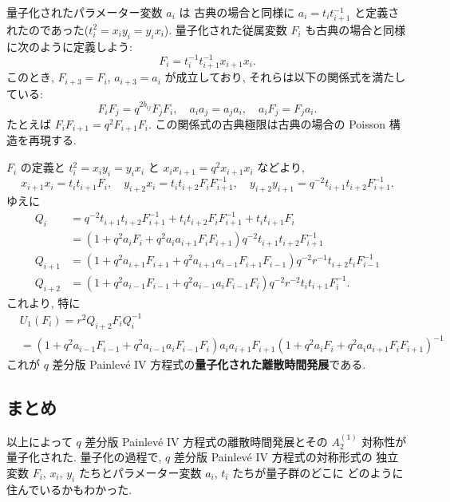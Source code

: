 \documentclass[12pt,twoside,dvipdfm]{msjproc}
\theoremstyle{definition} %
\theoremstyle{definition} %
\theoremstyle{definition} %
\numberwithin{theorem}{section}
\numberwithin{equation}{section}
\numberwithin{figure}{section}
\numberwithin{table}{section}
\begin{document}
量子化されたパラメーター変数 $a_i$ は
古典の場合と同様に $a_i=t_i t_{i+1}^{-1}$ と定義されたのであった($t_i^2=x_i y_i=y_i x_i$).
量子化された従属変数 $F_i$ も古典の場合と同様に次のように定義しよう:
\begin{equation*}
  F_i = t_i^{-1} t_{i+1}^{-1} x_{i+1} x_i.
\end{equation*}
このとき, $F_{i+3}=F_i$, $a_{i+3}=a_i$ が成立しており, 
それらは以下の関係式を満たしている:
\begin{equation*}
  F_i F_j = q^{2 b_{ij}} F_j F_i,  \quad
 a_i a_j = a_j a_i, \quad 
 a_i F_j = F_j a_i.
\end{equation*}
たとえば $F_i F_{i+1}=q^2 F_{i+1} F_i$.
この関係式の古典極限は古典の場合の Poisson 構造を再現する.


$F_i$ の定義と $t_i^2= x_i y_i = y_i x_i$ と $x_i x_{i+1}=q^2 x_{i+1}x_i$ などより,
\begin{equation*}
  x_{i+1} x_i = t_i t_{i+1} F_i, \quad
  y_{i+2} x_i = t_i t_{i+2} F_i F_{i+1}^{-1} ,\quad
  y_{i+2} y_{i+1} = q^{-2} t_{i+1} t_{i+2} F_{i+1}^{-1}.
\end{equation*}	
ゆえに
\begin{align*}
  Q_i 
  & = q^{-2} t_{i+1} t_{i+2} F_{i+1}^{-1}
  + t_i t_{i+2} F_i F_{i+1}^{-1}
  + t_i t_{i+1} F_i
  \\
  & = ( 1 + q^2 a_i F_i + q^2 a_i a_{i+1} F_i F_{i+1} ) 
      q^{-2}t_{i+1}t_{i+2}F_{i+1}^{-1}
  \\
  Q_{i+1}
  & = ( 1 + q^2 a_{i+1} F_{i+1} + q^2 a_{i+1} a_{i-1} F_{i+1} F_{i-1} )
      q^{-2}r^{-1}t_{i+2}t_iF_{i-1}^{-1}
  \\
  Q_{i+2}
  & = (1 + q^2 a_{i-1}F_{i-1} + q^2 a_{i-1} a_i F_{i-1} F_i)
      q^{-2}r^{-2}t_it_{i+1}F_i^{-1}.
\end{align*}
これより, 特に
\begin{align*}
 &
 U_1(F_i)
 = r^2 Q_{i+2} F_i Q_i^{-1}
 \\
 &= (1 + q^2 a_{i-1}F_{i-1} + q^2 a_{i-1} a_i F_{i-1} F_i)
    a_i a_{i+1} F_{i+1}
    (1 + q^2 a_i F_i + q^2 a_i a_{i+1} F_i F_{i+1})^{-1}
\end{align*}
これが $q$ 差分版 Painlev\'e IV 方程式の{\bf 量子化された離散時間発展}である.




\subsection{まとめ}

以上によって $q$ 差分版 Painlev\'e IV 方程式の離散時間発展とその $A^{(1)}_2$ 対称性が
量子化された.  量子化の過程で, $q$ 差分版 Painlev\'e IV 方程式の対称形式の
独立変数 $F_i$, $x_i$, $y_i$ たちとパラメーター変数 $a_i$, $t_i$ たちが量子群のどこに
どのように住んでいるかもわかった.
\end{document}
